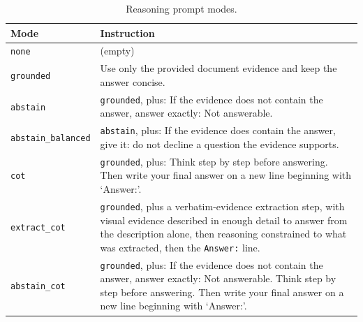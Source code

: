 \begin{table}[t]
\centering
\small
\setlength{\tabcolsep}{4pt}
\renewcommand{\arraystretch}{1.15}
\begin{tabular}{@{}
  >{\raggedright\arraybackslash}p{}
  >{\raggedright\arraybackslash}p{}@{}}
\toprule
\textbf{Mode} & \textbf{Instruction} \\
\midrule
\texttt{none} & (empty) \\
\texttt{grounded} & Use only the provided document evidence and keep the answer concise. \\
\texttt{abstain} & \texttt{grounded}, plus: If the evidence does not contain the answer, answer exactly: Not answerable. \\
\texttt{abstain\_balanced} & \texttt{abstain}, plus: If the evidence does contain the answer, give it: do not decline a question the evidence supports. \\
\texttt{cot} & \texttt{grounded}, plus: Think step by step before answering. Then write your final answer on a new line beginning with `Answer:'. \\
\texttt{extract\_cot} & \texttt{grounded}, plus a verbatim-evidence extraction step, with visual evidence described in enough detail to answer from the description alone, then reasoning constrained to what was extracted, then the \texttt{Answer:} line. \\
\texttt{abstain\_cot} & \texttt{grounded}, plus: If the evidence does not contain the answer, answer exactly: Not answerable. Think step by step before answering. Then write your final answer on a new line beginning with `Answer:'. \\
\bottomrule
\end{tabular}
\caption{Reasoning prompt modes.}
\label{tab:app_reasoning_prompts}
\end{table}